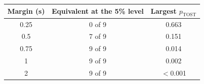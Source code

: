 \begin{tabular}{ccc}
\toprule
Margin (\pp{}s) & Equivalent at the 5\% level & Largest $p_{\mathrm{TOST}}$ \\
\midrule
0.25 & 0 of 9 & 0.663 \\
0.5 & 7 of 9 & 0.151 \\
0.75 & 9 of 9 & 0.014 \\
1 & 9 of 9 & 0.002 \\
2 & 9 of 9 & $<$0.001 \\
\bottomrule
\end{tabular}
